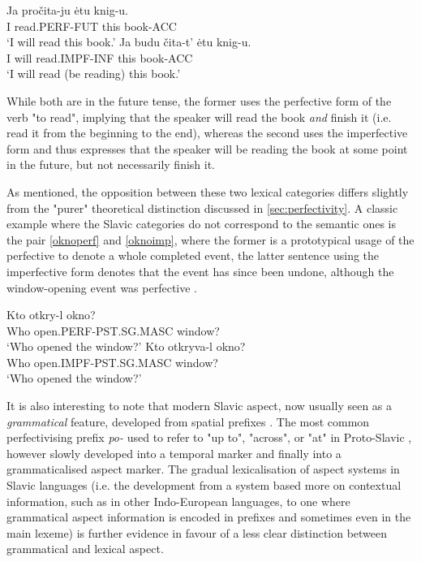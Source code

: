 \begin{exe}
    \ex \gll Ja pročita-ju ėtu knig-u.\\
                I read.PERF-FUT this book-ACC\\
                \glt `I will read this book.'
    \label{sent:japrocit}
    \ex \gll Ja budu čita-t' ėtu knig-u.\\
            I will read.IMPF-INF this book-ACC\\
            \glt `I will read (be reading) this book.'
    \label{sent:jabuducitat}
\end{exe}

While both are in the future tense, the former uses the perfective form of the verb "to read", implying that the speaker will read the book \emph{and} finish it (i.e. read it from the beginning to the end), whereas the second uses the imperfective form and thus expresses that the speaker will be reading the book at some point in the future, but not necessarily finish it.

As mentioned, the opposition between these two lexical categories differs slightly from the "purer" theoretical distinction discussed in \ref{sec:perfectivity}. A classic example where the Slavic categories do not correspond to the semantic ones is the pair \ref{oknoperf} and \ref{oknoimp}, where the former is a prototypical usage of the perfective to denote a whole completed event, the latter sentence using the imperfective form denotes that the event has since been undone, although the window-opening event was perfective \citep{franks2005slavic}.

\begin{exe}
    \ex \gll Kto otkry-l okno? \\
            Who open.PERF-PST.SG.MASC window? \\
        \glt `Who opened the window?'
    \label{oknoperf}
    \ex \gll Kto otkryva-l okno? \\
            Who open.IMPF-PST.SG.MASC window? \\
        \glt `Who opened the window?'
    \label{oknoimp}
\end{exe}

It is also interesting to note that modern Slavic aspect, now usually seen as a \emph{grammatical} feature, developed from spatial prefixes \citep{prefixation_in_rise_of_slav_asp}. The most common perfectivising prefix \emph{po-} used to refer to "up to", "across", or "at" in Proto-Slavic \citep{Derksen2008EtymologicalDO}, however slowly developed into a temporal marker and finally into a grammaticalised aspect marker. The gradual lexicalisation of aspect systems in Slavic languages (i.e. the development from a system based more on contextual information, such as in other Indo-European languages, to one where grammatical aspect information is encoded in prefixes and sometimes even in the main lexeme) is further evidence in favour of a less clear distinction between grammatical and lexical aspect.

